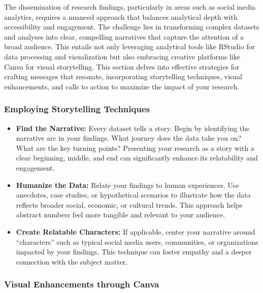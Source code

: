 \documentclass[
]{book}
\begin{document}
The dissemination of research findings, particularly in areas such as social media analytics, requires a nuanced approach that balances analytical depth with accessibility and engagement. The challenge lies in transforming complex datasets and analyses into clear, compelling narratives that capture the attention of a broad audience. This entails not only leveraging analytical tools like RStudio for data processing and visualization but also embracing creative platforms like Canva for visual storytelling. This section delves into effective strategies for crafting messages that resonate, incorporating storytelling techniques, visual enhancements, and calls to action to maximize the impact of your research.

\hypertarget{employing-storytelling-techniques}{%
\subsubsection{Employing Storytelling Techniques}\label{employing-storytelling-techniques}}

\begin{itemize}
\item
  \textbf{Find the Narrative:} Every dataset tells a story. Begin by identifying the narrative arc in your findings. What journey does the data take you on? What are the key turning points? Presenting your research as a story with a clear beginning, middle, and end can significantly enhance its relatability and engagement.
\item
  \textbf{Humanize the Data:} Relate your findings to human experiences. Use anecdotes, case studies, or hypothetical scenarios to illustrate how the data reflects broader social, economic, or cultural trends. This approach helps abstract numbers feel more tangible and relevant to your audience.
\item
  \textbf{Create Relatable Characters:} If applicable, center your narrative around ``characters'' such as typical social media users, communities, or organizations impacted by your findings. This technique can foster empathy and a deeper connection with the subject matter.
\end{itemize}

\hypertarget{visual-enhancements-through-canva}{%
\subsubsection{Visual Enhancements through Canva}\label{visual-enhancements-through-canva}}
\end{document}
